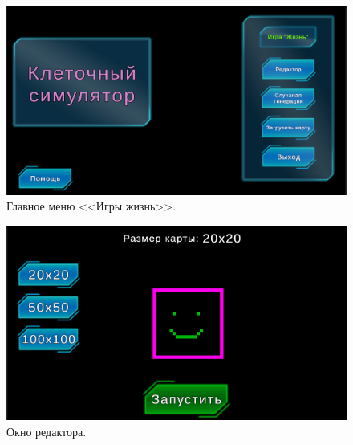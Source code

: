 \documentclass[14pt, oneside]{altsu-report}
\begin{document}
\begin{code}
	\vspace{-1cm}\inputminted[mathescape,linenos,frame=lines,fontsize=\tiny,breaklines]{csharp}{src/RandomButton.cs}
\end{code}

\begin{code}
	\vspace{-1cm}\inputminted[mathescape,linenos,frame=lines,fontsize=\tiny,breaklines]{csharp}{src/LevelTransition.cs}
\end{code}

\begin{figure}[H]
	\centering
	\includegraphics[width=1\textwidth]{images/MainMenu.png}  
	\caption{Главное меню <<Игры жизнь>>.}
	\label{MainM}
\end{figure}

\begin{figure}[H]
	\centering
	\includegraphics[width=1\textwidth]{images/Editor.png}  
	\caption{Окно редактора.}
	\label{Editor}
\end{figure}
\end{document}
